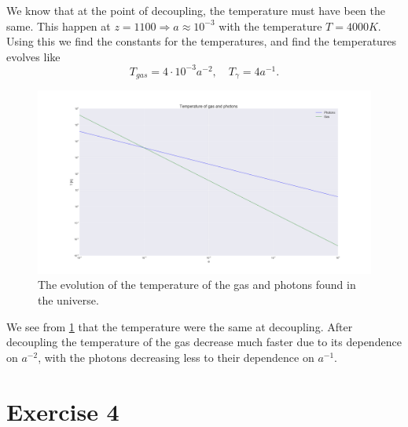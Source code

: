 \documentclass[a4paper,norsk, 10pt]{article}
\begin{document}
We know that at the point of decoupling, the temperature must have been the same. This happen at $z = 1100 \Rightarrow a \approx 10^{-3}$ with the temperature $T = 4000K$. Using this we find the constants for the temperatures, and find the temperatures evolves like
\begin{equation}
T_{gas} = 4\cdot 10^{-3}a^{-2}, \quad T_{\gamma} = 4a^{-1}.
\end{equation}

\begin{figure}[!h]
\centering
\includegraphics[scale=0.25]{temp}
\caption{The evolution of the temperature of the gas and photons found in the universe.}\label{fig:temp}
\end{figure}

We see from \ref{fig:temp} that the temperature were the same at decoupling. After decoupling the temperature of the gas decrease much faster due to its dependence on $a^{-2}$, with the photons decreasing less to their dependence on $a^{-1}$. 


\section{Exercise 4}
\end{document}
